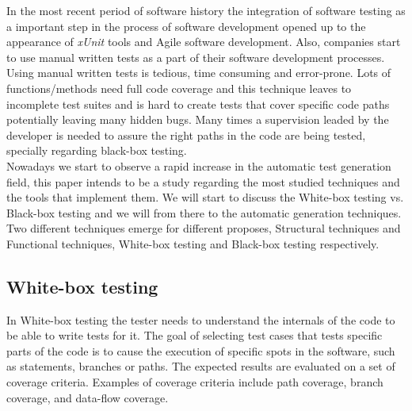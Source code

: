 \documentclass[citeauthoryear]{llncs}
\newcommand{\xunit}{\textit{xUnit}}
\begin{document}
In the most recent period of software history the integration of software testing as a important step in the process of
software development opened up to the appearance of \xunit\cite{xunit} tools and Agile software development.
Also, companies start to use manual written tests as a part of their software development processes.\\
Using  manual written tests is tedious, time consuming and error-prone. Lots of functions/methods need full code coverage and this technique leaves
to incomplete test suites and is hard to create tests that cover specific code paths potentially leaving many hidden bugs. Many times a supervision leaded by the developer
is needed to assure the right paths in the code are being tested, specially regarding black-box testing.\\
\indent Nowadays we start to observe a rapid increase in the automatic test generation field, this paper intends to be a study regarding the most studied techniques
and the tools that implement them. We will start to discuss the White-box testing vs. Black-box testing and we will from there to the automatic generation techniques.\\

Two different techniques emerge for different proposes, Structural techniques and Functional techniques,
White-box testing and Black-box\cite{black} testing respectively.

\subsection{White-box testing}
In White-box testing the tester needs to understand the internals of the code to be able to write tests for it.
The goal of selecting test cases that tests specific parts of the code is to cause the execution of specific spots in the software, such as statements, branches or
paths. The expected results are evaluated on a set of coverage criteria. Examples of coverage criteria include path coverage, branch coverage, and data-flow coverage.
\end{document}
